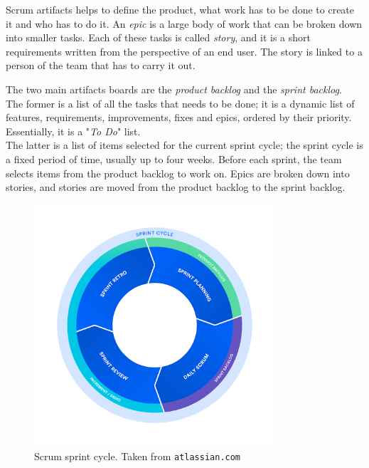 Scrum artifacts helps to define the product, what work has to be done to create it and who has to do it. An \textit{epic} is a large body of work that can be broken down into smaller tasks. Each of these tasks is called \textit{story}, and it is a short requirements written from the perspective of an end user. The story is linked to a person of the team that has to carry it out.

The two main artifacts boards are the \textit{product backlog} and the \textit{sprint backlog}. \\
The former is a list of all the tasks that needs to be done; it is a dynamic list of features, requirements, improvements, fixes and epics, ordered by their priority. Essentially, it is a "\textit{To Do}" list.\\
The latter is a list of items selected for the current sprint cycle; the sprint cycle is a fixed period of time, usually up to four weeks. Before each sprint, the team selects items from the product backlog to work on. Epics are broken down into stories, and stories are moved from the product backlog to the sprint backlog.~\cite{scrum-epic-stories}

\begin{figure}[t]
  \centering
  \includegraphics[width=0.8\textwidth]{chapters/04/assets/scrum}
  \caption{Scrum sprint cycle. Taken from \texttt{atlassian.com}}
  \label{fig:scrum-sprint-cycle}
\end{figure}

